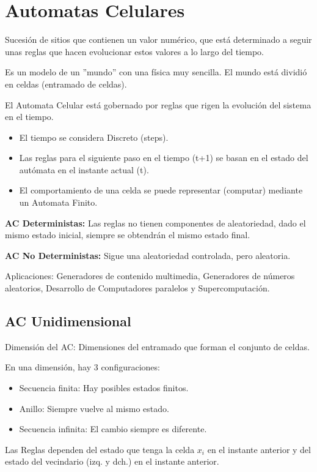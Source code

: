 \section{Automatas Celulares}
Sucesión de sitios que contienen un valor numérico, que está determinado a seguir unas reglas que hacen evolucionar estos valores a lo largo del tiempo.

Es un modelo de un ''mundo'' con una física muy sencilla. El mundo está dividió en celdas (entramado de celdas).

El Automata Celular está gobernado por reglas que rigen la evolución del sistema en el tiempo.
\begin{itemize}
    \item El tiempo se considera Discreto (steps).
    \item Las reglas para el siguiente paso en el tiempo (t+1) se basan en el estado del autómata en el instante actual (t).
    \item El comportamiento de una celda se puede representar (computar) mediante un Automata Finito.
\end{itemize}

\textbf{AC Deterministas:} Las reglas no tienen componentes de aleatoriedad, dado el mismo estado inicial, siempre se obtendrán el mismo estado final.

\textbf{AC No Deterministas:} Sigue una aleatoriedad controlada, pero aleatoria.

Aplicaciones: Generadores de contenido multimedia, Generadores de números aleatorios, Desarrollo de Computadores paralelos y Supercomputación.

\subsection{AC Unidimensional}
Dimensión del AC: Dimensiones del entramado que forman el conjunto de celdas.

En una dimensión, hay 3 configuraciones:
\begin{itemize}
    \item Secuencia finita: Hay posibles estados finitos.
    \item Anillo: Siempre vuelve al mismo estado.
    \item Secuencia infinita: El cambio siempre es diferente.
\end{itemize}

Las Reglas dependen del estado que tenga la celda $x_i$ en el instante anterior y del estado del vecindario (izq. y dch.) en el instante anterior.

